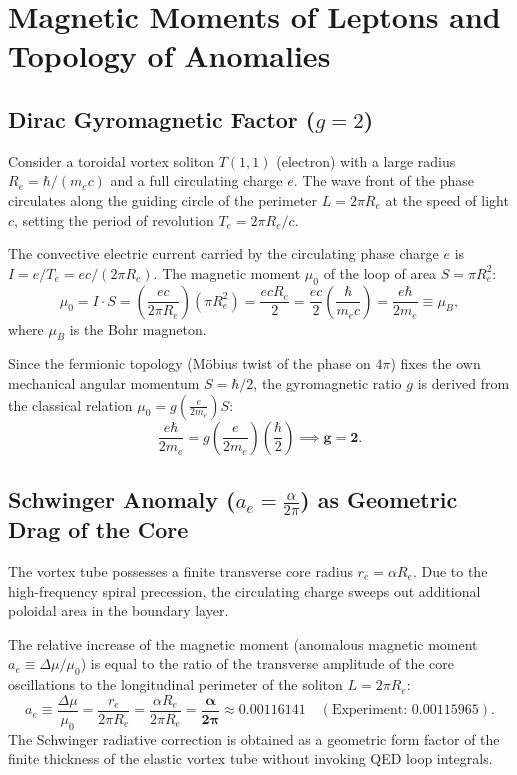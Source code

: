 \documentclass[12pt,a4paper]{article}
\begin{document}
\section{Magnetic Moments of Leptons and Topology of Anomalies}
				
	\subsection{Dirac Gyromagnetic Factor ($g=2$)}
	Consider a toroidal vortex soliton $T(1,1)$ (electron) with a large radius $R_e = \hbar / (m_e c)$ and a full circulating charge $e$. The wave front of the phase circulates along the guiding circle of the perimeter $L = 2\pi R_e$ at the speed of light $c$, setting the period of revolution $T_e = 2\pi R_e / c$.
				
	The convective electric current carried by the circulating phase charge $e$ is $I = e / T_e = e c / (2\pi R_e)$. The magnetic moment $\mu_0$ of the loop of area $S = \pi R_e^2$:
	\begin{equation}
	\mu_0 = I \cdot S = \left( \frac{e c}{2\pi R_e} \right) \left( \pi R_e^2 \right) = \frac{e c R_e}{2} = \frac{e c}{2} \left( \frac{\hbar}{m_e c} \right) = \frac{e \hbar}{2 m_e} \equiv \mu_B,
	\end{equation}
	where $\mu_B$ is the Bohr magneton.
				
	Since the fermionic topology (Möbius twist of the phase on $4\pi$) fixes the own mechanical angular momentum $S = \hbar/2$, the gyromagnetic ratio $g$ is derived from the classical relation $\mu_0 = g \left( \frac{e}{2 m_e} \right) S$:
	\begin{equation}
	\frac{e \hbar}{2 m_e} = g \left( \frac{e}{2 m_e} \right) \left( \frac{\hbar}{2} \right) \implies \mathbf{g = 2}.
	\end{equation}
				
	\subsection{Schwinger Anomaly ($a_e = \frac{\alpha}{2\pi}$) as Geometric Drag of the Core}
	The vortex tube possesses a finite transverse core radius $r_e = \alpha R_e$. Due to the high-frequency spiral precession, the circulating charge sweeps out additional poloidal area in the boundary layer.
				
	The relative increase of the magnetic moment (anomalous magnetic moment $a_e \equiv \Delta \mu / \mu_0$) is equal to the ratio of the transverse amplitude of the core oscillations to the longitudinal perimeter of the soliton $L = 2\pi R_e$:
	\begin{equation}
	a_e \equiv \frac{\Delta \mu}{\mu_0} = \frac{r_e}{2\pi R_e} = \frac{\alpha R_e}{2\pi R_e} = \mathbf{\frac{\alpha}{2\pi}} \approx \mathbf{0.00116141} \quad (\text{Experiment: } 0.00115965).
	\end{equation}
	The Schwinger radiative correction is obtained as a geometric form factor of the finite thickness of the elastic vortex tube without invoking QED loop integrals.
				
\end{document}
